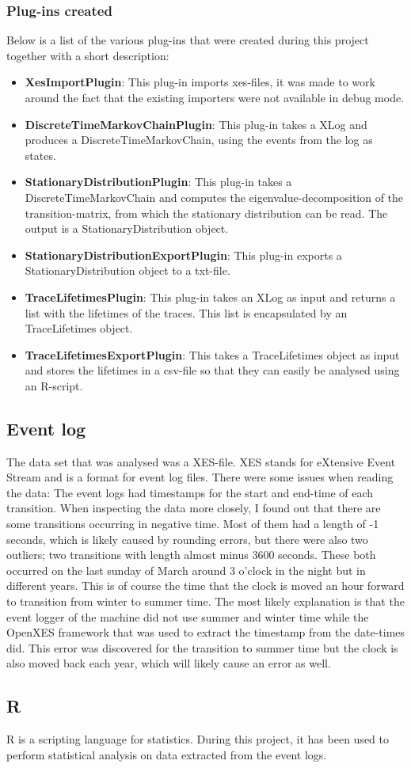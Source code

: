 \subsubsection{Plug-ins created}
Below is a list of the various plug-ins that were created during this project together with a short description:
\begin{itemize}
\item \textbf{XesImportPlugin}: This plug-in imports xes-files, it was made to work around the fact that the existing importers were not available in debug mode.
\item \textbf{DiscreteTimeMarkovChainPlugin}: This plug-in takes a XLog and produces a DiscreteTimeMarkovChain, using the events from the log as states.
\item \textbf{StationaryDistributionPlugin}: This plug-in takes a DiscreteTimeMarkovChain and computes the eigenvalue-decomposition of the transition-matrix, from which the stationary distribution can be read. The output is a StationaryDistribution object.
\item \textbf{StationaryDistributionExportPlugin}: This plug-in exports a StationaryDistribution object to a txt-file.
\item \textbf{TraceLifetimesPlugin}: This plug-in takes an XLog as input and returns a list with the lifetimes of the traces. This list is encapsulated by an TraceLifetimes object.
\item \textbf{TraceLifetimesExportPlugin}: This takes a TraceLifetimes object as input and stores the lifetimes in a csv-file so that they can easily be analysed using an R-script.
\end{itemize}

\subsection{Event log}
The data set that was analysed was a XES-file. XES stands for eXtensive Event Stream and is a format for event log files.
There were some issues when reading the data: The event logs had timestamps for the start and end-time of each transition. When inspecting the data more closely, I found out that there are some transitions occurring in negative time. Most of them had a length of -1 seconds, which is likely caused by rounding errors, but there were also two outliers; two transitions with length almost minus 3600 seconds. These both occurred on the last sunday of March around 3 o'clock in the night but in different years. This is of course the time that the clock is moved an hour forward to transition from winter to summer time. The most likely explanation is that the event logger of the machine did not use summer and winter time while the OpenXES framework that was used to extract the timestamp from the date-times did. This error was discovered for the transition to summer time but the clock is also moved back each year, which will likely cause an error as well.

\subsection{R}
R is a scripting language for statistics. During this project, it has been used to perform statistical analysis on data extracted from the event logs.